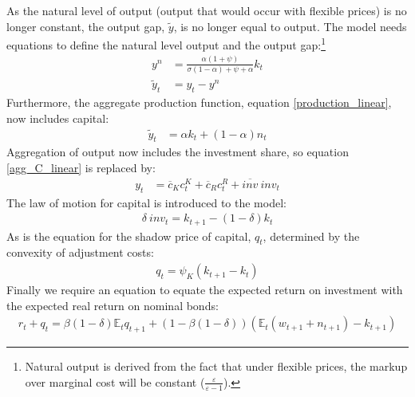 \documentclass[titlepage]{\econtex}\newcommand{\texname}{ConsumptionHeterogeneity}
\begin{document}
As the natural level of output (output that would occur with flexible prices) is no longer constant, the output gap, $\tilde{y}$, is no longer equal to output. The model needs equations to define the natural level output and the output gap:\footnote{Natural output is derived from the fact that under flexible prices, the markup over marginal cost will be constant ($\frac{\varepsilon}{\varepsilon-1}$).}
\begin{align}
y^{n} &= \frac{\alpha(1+\psi)}{\sigma(1-\alpha) + \psi + \alpha} k_{t} \label{y_nat_linear} \\
\tilde{y}_t &= y_t - y^{n}	\label{output_gap_linear}
\end{align}
Furthermore, the aggregate production function, equation \ref{production_linear}, now includes capital:
\begin{align}
\tilde{y}_t &= \alpha k_t +  (1-\alpha)n_t  \label{production_capital_linear}
\end{align}
Aggregation of output now includes the investment share, so equation \ref{agg_C_linear} is replaced by:
\begin{align}
y_t &= \overline{c}_{K} c^K_t + \overline{c}_{R} c^R_t + \overline{\textit{inv}} \ \textit{inv}_t \label{agg_Y_linear}
\end{align}
The law of motion for capital is introduced to the model:
\begin{align}
\delta \ \textit{inv}_t = k_{t+1} - (1-\delta) k_{t}    \label{lom_capital}
\end{align}
As is the equation for the shadow price of capital, $q_t$, determined by the convexity of adjustment costs:
\begin{align}
q_t = \psi_K (k_{t+1}-k_t)	\label{shadow_K}
\end{align}
Finally we require an equation to equate the expected return on investment with the expected real return on nominal bonds:
\begin{align}
r_t + q_t = \beta (1-\delta) \mathbb{E}_t q_{t+1} + (1 - \beta (1-\delta)) (\mathbb{E}_t (w_{t+1} + n_{t+1}) - k_{t+1})	\label{return_K}
\end{align}
\end{document}
